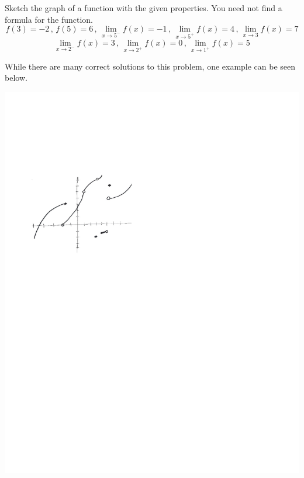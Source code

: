 \documentclass[nooutcomes]{ximera}
\begin{document}
\begin{problem}
\begin{freeResponse}
	\end{freeResponse}
	
\end{problem}
			
			
			

\begin{problem}
Sketch the graph of a function with the given properties.  You need not find a formula for the function.
	$$ f(3) = -2 \, , \, f(5) = 6 \, , \, \lim_{x \to 5^-} f(x) = -1 \, , \,   \lim_{x \to 5^+} f(x) = 4 \, , \,  \lim_{x \to 3} f(x) = 7 $$
	$$  \lim_{x \to 2^-} f(x) = 3 \, , \,  \lim_{x \to 2^+} f(x) = 0 \, , \,  \lim_{x \to 1^+} f(x) = 5  $$
	\begin{freeResponse}
	While there are many correct solutions to this problem, one example can be seen below.
	
		\begin{image}
		\includegraphics[trim= 70 470 250 160]{Figure4.pdf}
		\end{image}
	\end{freeResponse}
\end{problem}
	
\end{document}
